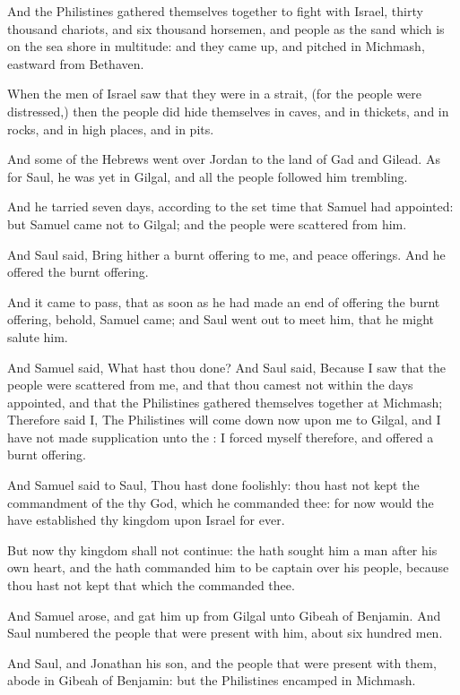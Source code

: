 \verse And the Philistines gathered themselves together to fight with Israel, thirty thousand chariots, and six thousand horsemen, and people as the sand which is on the sea shore in multitude: and they came up, and pitched in Michmash, eastward from Bethaven.

\verse When the men of Israel saw that they were in a strait, (for the people were distressed,) then the people did hide themselves in caves, and in thickets, and in rocks, and in high places, and in pits.

\verse And some of the Hebrews went over Jordan to the land of Gad and Gilead. As for Saul, he was yet in Gilgal, and all the people followed him trembling.

\verse And he tarried seven days, according to the set time that Samuel had appointed: but Samuel came not to Gilgal; and the people were scattered from him.

\verse And Saul said, Bring hither a burnt offering to me, and peace offerings. And he offered the burnt offering.

\verse And it came to pass, that as soon as he had made an end of offering the burnt offering, behold, Samuel came; and Saul went out to meet him, that he might salute him.

\verse And Samuel said, What hast thou done? And Saul said, Because I saw that the people were scattered from me, and that thou camest not within the days appointed, and that the Philistines gathered themselves together at Michmash; \verse Therefore said I, The Philistines will come down now upon me to Gilgal, and I have not made supplication unto the \LORD: I forced myself therefore, and offered a burnt offering.

\verse And Samuel said to Saul, Thou hast done foolishly: thou hast not kept the commandment of the \LORD thy God, which he commanded thee: for now would the \LORD have established thy kingdom upon Israel for ever.

\verse But now thy kingdom shall not continue: the \LORD hath sought him a man after his own heart, and the \LORD hath commanded him to be captain over his people, because thou hast not kept that which the \LORD commanded thee.

\verse And Samuel arose, and gat him up from Gilgal unto Gibeah of Benjamin. And Saul numbered the people that were present with him, about six hundred men.

\verse And Saul, and Jonathan his son, and the people that were present with them, abode in Gibeah of Benjamin: but the Philistines encamped in Michmash.

